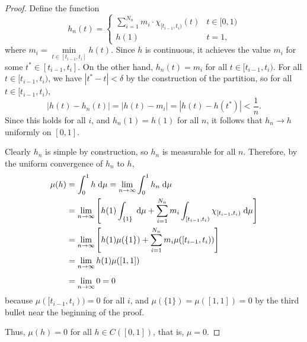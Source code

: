 \documentclass{homework}
\begin{document}
\begin{arabicparts}
\begin{proof}
			Define the function
			\begin{equation}
				h_n(t) = \begin{cases}
					\sum\limits_{i=1}^{N_n} m_i\cdot\chi_{[t_{i-1}, t_i)}(t) & t \in [0,1) \\
					h(1) & t = 1,
				\end{cases}
			\end{equation}
			where $m_i = \min\limits_{t \in [t_{i-1}, t_i]} h(t)$. Since $h$ is continuous, it achieves the value $m_i$ for some $t^* \in [t_{i-1},t_i]$. On the other hand, $h_n(t) = m_i$ for all $t \in [t_{i-1}, t_i)$. For all $t \in [t_{i-1}, t_i)$, we have $|t^* - t| < \delta$ by the construction of the partition, so for all $t \in [t_{i-1}, t_i)$,
			\begin{equation}
				|h(t) - h_n(t)| = |h(t) - m_i| = |h(t) - h(t^*)| < \frac{1}{n}.
			\end{equation}
			Since this holds for all $i$, and $h_n(1) = h(1)$ for all $n$, it follows that $h_n \to h$ uniformly on $[0,1]$.
			
			Clearly $h_n$ is simple by construction, so $h_n$ is measurable for all $n$. Therefore, by the uniform convergence of $h_n$ to $h$,
			\begin{align}
				\mu(h) &= \int_0^1h\;\text{d} \mu = \lim_{n\to\infty}\int_0^1h_n\;\text{d}\mu \\
				&= \lim_{n\to\infty}\left[h(1)\int_{\{1\}}\;\text{d}\mu  + \sum_{i=1}^{N_n}m_i\int_{[t_{i-1},t_i)}\chi_{[t_{i-1}, t_i)} \;\text{d} \mu\right] \\
				&= \lim_{n\to\infty}\left[h(1)\mu(\{1\}) + \sum_{i=1}^{N_n}m_i\mu([t_{i-1},t_i))\right] \\
				&= \lim_{n\to\infty}h(1)\mu([1,1]) \\[0.5em]
				&= \lim_{n\to\infty}0 = 0
			\end{align}
			because $\mu([t_{i-1},t_i)) = 0$ for all $i$, and $\mu(\{1\}) = \mu([1,1]) = 0$ by the third bullet near the beginning of the proof.
			
			Thus, $\mu(h) = 0$ for all $h \in C([0,1])$, that is, $\mu = 0$.
		\end{proof}
		

\end{arabicparts}
\end{document}
